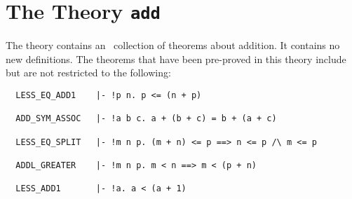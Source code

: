 \section{The Theory {\tt add}}

The theory  contains an
\adhoc\ collection of 
theorems about addition. It contains no new definitions.
The theorems that have been pre-proved in this theory include but are not
restricted to the following:
\begin{hol}
\begin{verbatim}
  LESS_EQ_ADD1    |- !p n. p <= (n + p)

  ADD_SYM_ASSOC   |- !a b c. a + (b + c) = b + (a + c)

  LESS_EQ_SPLIT   |- !m n p. (m + n) <= p ==> n <= p /\ m <= p

  ADDL_GREATER    |- !m n p. m < n ==> m < (p + n)

  LESS_ADD1       |- !a. a < (a + 1)
\end{verbatim}\end{hol}
